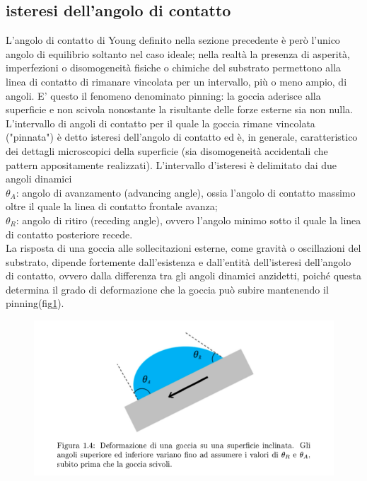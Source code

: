 \documentclass[letterpaper,12pt]{article}
\begin{document}
\subsection{isteresi dell'angolo di contatto}
L'angolo di contatto di Young definito nella sezione precedente è però l'unico angolo di equilibrio soltanto nel caso ideale; nella realtà la presenza di asperità, imperfezioni o disomogeneità fisiche o chimiche del substrato permettono alla linea di contatto di rimanare vincolata per un intervallo, più o meno ampio, di angoli. E' questo il fenomeno denominato pinning: la goccia aderisce alla superficie e non scivola nonostante la risultante delle forze esterne sia non nulla.
L'intervallo di angoli di contatto per il quale la goccia rimane vincolata ("pinnata") è detto isteresi dell'angolo di contatto ed è, in generale, caratteristico dei dettagli microscopici della superficie (sia disomogeneità accidentali che pattern appositamente realizzati). L'intervallo d'isteresi è delimitato dai due angoli dinamici\\
$\theta_A$: angolo di avanzamento (advancing angle), ossia l'angolo di contatto massimo oltre il quale la linea di contatto frontale avanza;\\
$\theta_R$: angolo di ritiro (receding angle), ovvero l'angolo minimo sotto il quale la linea di contatto posteriore recede.\\
La risposta di una goccia alle sollecitazioni esterne, come gravità o oscillazioni del substrato, dipende fortemente dall'esistenza e dall'entità dell'isteresi dell'angolo di contatto, ovvero dalla differenza tra gli angoli dinamici anzidetti, poiché questa determina il grado di deformazione che la goccia può subire mantenendo il pinning(fig\ref{fig:2}).\\
\begin{figure}[h!] 
	\centering \includegraphics[width=0.8\columnwidth]{pinning.PNG}
	\label{fig:2}
\end{figure}
\end{document}
